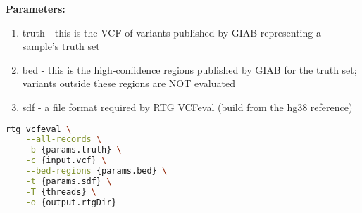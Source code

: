 \noindent\textbf{Parameters:}
\begin{enumerate}
    \item truth - this is the VCF of variants published by GIAB representing a sample's truth set
    \item bed - this is the high-confidence regions published by GIAB for the truth set; variants outside these regions are NOT evaluated
    \item sdf - a file format required by RTG VCFeval (build from the hg38 reference)
\end{enumerate}

\begin{lstlisting}[language=bash]
rtg vcfeval \
    --all-records \
    -b {params.truth} \
    -c {input.vcf} \
    --bed-regions {params.bed} \
    -t {params.sdf} \
    -T {threads} \
    -o {output.rtgDir}
\end{lstlisting}